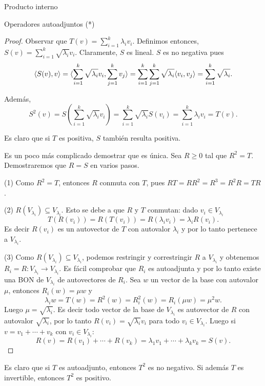 \begin{chapter}{Producto interno}
\begin{section}{Operadores autoadjuntos (*)}
\begin{proof}
             Observar que $T(v)= \sum_{i=1}^k {\lambda_i}v_i$. Definimos entonces, $S(v) = \sum_{i=1}^k \sqrt{\lambda_i} v_i$.  Claramente, $S$ es lineal. $S$ es no negativa pues
             $$
             \langle S(v),v \rangle =  \langle \sum_{i=1}^k \sqrt{\lambda_i} v_i,\sum_{j=1}^k  v_j \rangle  = 
             \sum_{i=1}^k\sum_{j=1}^k \sqrt{\lambda_i}\langle  v_i,  v_j \rangle  = \sum_{i=1}^k \sqrt{\lambda_i}.
             $$
             
            
            Además, $$S^2(v) = S(\sum_{i=1}^k \sqrt{\lambda_i} v_i) = \sum_{i=1}^k \sqrt{\lambda_i}S( v_i) = \sum_{i=1}^k {\lambda_i}v_i = T(v).$$
            
            Es claro que si $T$ es positiva,  $S$ también resulta positiva.
            
            Es un poco más complicado demostrar que es única. Sea $R \ge 0$ tal que $R^2 = T$. Demostraremos que $R=S$ en varios pasos. 
            
            
            (1) Como $R^2 = T$, entonces $R$ conmuta con $T$, pues $RT = RR^2 = R^3 = R^2R = TR$. 
            
            (2) $R(V_{\lambda_i}) \subseteq V_{\lambda_i}$. Esto se debe a que $R$ y $T$ conmutan: dado $v_i \in V_{\lambda_i}$
            $$
            T(R(v_i)) = R(T(v_i)) = R(\lambda_i v_i) = \lambda_iR(v_i).  
            $$ 
            Es decir $R(v_i)$ es un autovector de $T$ con  autovalor $\lambda_i$ y por lo tanto pertenece a  $V_{\lambda_i}$. 
            
            (3)  Como $R(V_{\lambda_i}) \subseteq V_{\lambda_i}$, podemos restringir y correstringir  $R$ a $V_{\lambda_i}$ y obtenemos $R_i = R:  V_{\lambda_i} \to V_{\lambda_i}$. Es  fácil comprobar que $R_i$ es autoadjunta y por lo tanto existe una BON de $V_{\lambda_i}$ de autovectores de $R_i$. Sea $w$ un vector de la base con autovalor $\mu$, entonces 	$R_i(w) = \mu w$  y 
            $$
        \lambda_i w = T(w) = R^2(w) = R_i^2(w) = R_i(\mu w) = \mu^2 w. 
            $$
            Luego $\mu= \sqrt{\lambda_i}$. Es decir todo vector de la base de $V_{\lambda_i}$  es autovector de $R$ con  autovalor $\sqrt{\lambda_i}$, por lo tanto $R(v_i) =  \sqrt{\lambda_i}v_i$ para todo $v_i \in V_{\lambda_i}$. Luego si   $v = v_1+\cdots+v_k$ con $v_i \in V_{\lambda_i}$:
            $$
            R(v) = R(v_1)+\cdots+R(v_k) = \lambda_1 v_1+\cdots+\lambda_k v_k = S(v).
            $$
        \end{proof}
        
        \begin{observacion*} Es claro que si $T$  es autoadjunto, entonces $T^2$ es no negativo. Si además $T$ es invertible, entonces $T^2$ es positivo. 
            

\end{observacion*}
\end{section}
\end{chapter}
